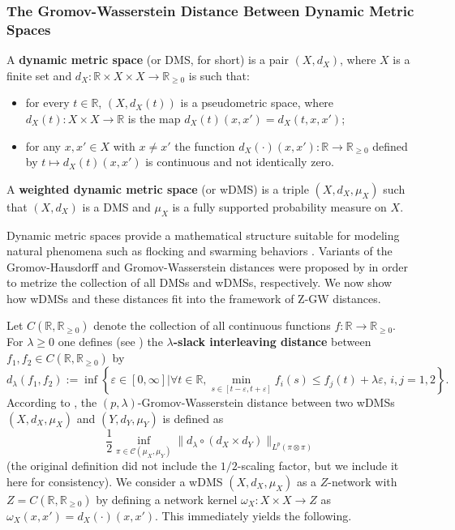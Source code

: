 \documentclass[twoside,11pt]{article}
\theoremstyle{definition}
\newcommand{\R}{\mathbb{R}}
\newcommand{\define}[1]{\textbf{#1}}
\begin{document}
\subsubsection{The Gromov-Wasserstein Distance Between Dynamic Metric Spaces}


A \define{dynamic metric space} (or DMS, for short) is a pair $(X,d_X)$, where $X$ is a finite set and $d_X:\R\times X\times X\to \R_{\geq 0}$ is such that: 
\begin{itemize}
\item for every $t\in \R$, $(X,d_X(t))$ is a pseudometric space, where $d_X(t):X \times X \to \R$ is the map $d_X(t)(x,x') = d_X(t,x,x')$;
\item for any $x,x'\in X$ with $x\neq x'$ the function $d_X(\cdot)(x,x'):\R\to \R_{\geq 0}$ defined by $t \mapsto d_X(t)(x,x')$ is continuous and not identically zero.
\end{itemize}
A \define{weighted dynamic metric space} (or wDMS) is a triple $(X,d_X,\mu_X)$ such that $(X,d_X)$ is a DMS and $\mu_X$ is a fully supported probability measure on $X$. 

Dynamic metric spaces provide a mathematical structure suitable for modeling natural phenomena such as flocking and swarming behaviors \citep{sumpter2010collective}. Variants of the Gromov-Hausdorff and Gromov-Wasserstein distances were proposed by  \citet{kim2020analysis,kim2021spatiotemporal,woojin-thesis} in order to metrize the collection of all DMSs and wDMSs, respectively. We now show how wDMSs and these distances fit into the framework of Z-GW distances.

Let $C(\R,\R_{\geq 0})$ denote the collection of all continuous functions $f:\R\to \R_{\geq 0}$. For $\lambda \geq 0$ one defines (see \citealp[Definition 2.7.1]{woojin-thesis}) the \define{$\lambda$-slack interleaving distance} between $f_1,f_2\in C(\R,\R_{\geq 0})$ by
\[
d_{\lambda}(f_1,f_2):=\inf\left\{\varepsilon\in[0,\infty]|\forall t\in\R, \min_{s\in[t-\varepsilon,t+\varepsilon]} f_i(s)\leq f_j(t)+\lambda\varepsilon,\,i,j=1,2\right\}.
\]
According to \citet[Definition 2.9.5]{woojin-thesis}, the $(p,\lambda)$-Gromov-Wasserstein distance between two wDMSs $(X,d_X,\mu_X)$ and $(Y,d_Y,\mu_Y)$ is defined as
\[
\frac{1}{2}\inf_{\pi\in\mathcal{C}(\mu_X,\mu_Y)}\big\|d_\lambda \circ (d_X \times d_Y)\big\|_{L^p(\pi\otimes \pi)}
\]
(the original definition did not include the $1/2$-scaling factor, but we include it here for consistency). We consider a wDMS $(X,d_X,\mu_X)$ as a $Z$-network with $Z = C(\R,\R_{\geq 0})$ by defining a network kernel $\omega_X:X \times X \to Z$ as $\omega_X(x,x') = d_X(\cdot)(x,x')$. 
This immediately yields the following.
\end{document}

